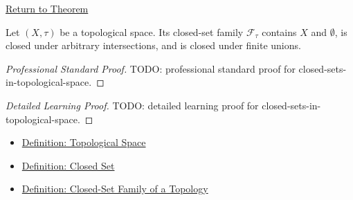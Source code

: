 \newpage
{}
\label{prf:closed-sets-in-topological-space}

\begin{remark*}[Return]
\hyperref[thm:closed-sets-in-topological-space]{Return to Theorem}
\end{remark*}

\begin{theorem*}
Let \((X,\tau)\) be a topological space.  Its closed-set family
\(\mathcal{F}_{\tau}\) contains \(X\) and \(\emptyset\), is closed under
arbitrary intersections, and is closed under finite unions.
\end{theorem*}

\begin{proof}[Professional Standard Proof]
\LRAProofBodyStart
TODO: professional standard proof for closed-sets-in-topological-space.
\end{proof}

\begin{proof}[Detailed Learning Proof]
\LRAProofBodyStart
TODO: detailed learning proof for closed-sets-in-topological-space.
\end{proof}

\begin{remark*}
\end{remark*}

\begin{dependencies}
\begin{itemize}
  \item \hyperref[def:topological-space]{Definition: Topological Space}
  \item \hyperref[def:topological-closed-set]{Definition: Closed Set}
  \item \hyperref[def:closed-set-family-of-topology]{Definition: Closed-Set Family of a Topology}
\end{itemize}
\end{dependencies}

\clearpage
